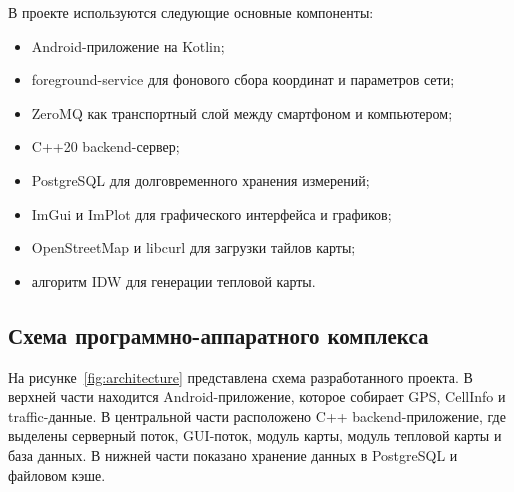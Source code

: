 \documentclass[14pt,a4paper]{extarticle}
\begin{document}
В проекте используются следующие основные компоненты:
\begin{itemize}
    \item Android-приложение на Kotlin;
    \item foreground-service для фонового сбора координат и параметров сети;
    \item ZeroMQ как транспортный слой между смартфоном и компьютером;
    \item C++20 backend-сервер;
    \item PostgreSQL для долговременного хранения измерений;
    \item ImGui и ImPlot для графического интерфейса и графиков;
    \item OpenStreetMap и libcurl для загрузки тайлов карты;
    \item алгоритм IDW для генерации тепловой карты.
\end{itemize}

\subsection{Схема программно-аппаратного комплекса}

На рисунке~\ref{fig:architecture} представлена схема разработанного проекта. В верхней части находится Android-приложение, которое собирает GPS, CellInfo и traffic-данные. В центральной части расположено C++ backend-приложение, где выделены серверный поток, GUI-поток, модуль карты, модуль тепловой карты и база данных. В нижней части показано хранение данных в PostgreSQL и файловом кэше.
\end{document}
